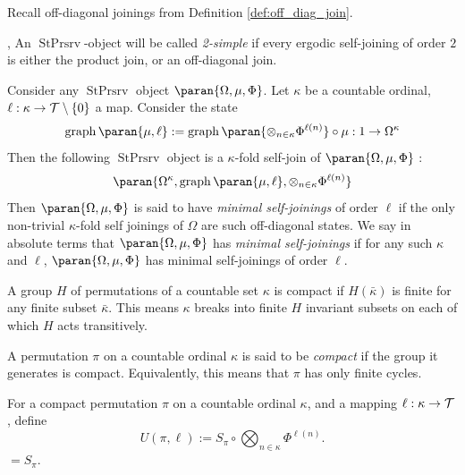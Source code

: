 \documentclass[12pt,oneside,pb-diagram]{article}
\DeclareMathOperator{\sps}{StPrsrv}
\DeclareMathOperator{\graph}{graph}
\begin{document}
Recall off-diagonal joinings from Definition \ref{def:off_diag_join}.

\begin{definition} 
	\cite[Sec 6.1]{glasner2015join}, \cite{Rudolph1979join} An $\sps$-object will be called \emph{2-simple} if every ergodic self-joining of order $2$ is either the product join, or an off-diagonal join.
\end{definition}

\begin{definition} 
	\cite[pg 2]{Rudolph1979join} Consider any $\sps$ object $\paran{ \Omega, \mu, \Phi }$. Let $\kappa$ be a countable ordinal, $\ell : \kappa \to \mathcal{T} \setminus \{0\}$ a map. Consider the state
	\[ \graph \paran{ \mu, \ell } := \graph\paran{ \otimes_{n\in\kappa} \Phi^{\ell(n)} } \circ \mu : 1 \to \Omega^{\kappa} \]
	Then the following $\sps$ object is a $\kappa$-fold self-join of $\paran{ \Omega, \mu, \Phi }$ : 
	\[ \paran{ \Omega^{\kappa}, \graph \paran{ \mu, \ell } , \otimes_{n\in\kappa} \Phi^{\ell(n)} } \]
	Then $\paran{ \Omega, \mu, \Phi }$ is said to have \emph{minimal self-joinings} of order $\ell$ if the only non-trivial $\kappa$-fold self joinings of $\Omega$ are such off-diagonal states. We say in absolute terms that $\paran{ \Omega, \mu, \Phi }$ has \emph{minimal self-joinings} if for any such $\kappa$ and $\ell$, $\paran{ \Omega, \mu, \Phi }$ has minimal self-joinings of order $\ell$.
\end{definition}

\begin{definition} 
	\cite[pg 14]{Rudolph1979join} A group $H$ of permutations of a countable set $\kappa$ is compact if $H(\bar{\kappa})$ is finite for any finite subset $\bar{\kappa}$. This means $\kappa$ breaks into finite $H$ invariant subsets on each of which $H$ acts transitively.
\end{definition}

\begin{definition} 
	\cite[pg 14]{Rudolph1979join} A permutation $\pi$ on a countable ordinal $\kappa$ is said to be \textit{compact} if the group it generates is compact. Equivalently, this means that $\pi$ has only finite cycles. 
\end{definition}

For a compact permutation $\pi$  on a countable ordinal $\kappa$, and a mapping $\ell : \kappa \to \mathcal{T}$, define
%
\[ U(\pi, \ell) := S_{\pi} \circ \bigotimes_{n \in \kappa} \Phi^{\ell(n)} .\]
%
$ = S_\pi $. %
\end{document}
